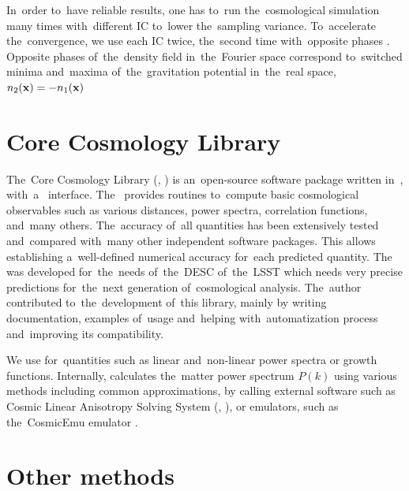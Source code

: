 In~order to~have reliable results, one has to~run the~cosmological simulation many times with~different IC to~lower the~sampling variance. To~accelerate the~convergence, we use each IC twice, the~second time with~opposite phases \parencite{PhysRevD.93.103519}. Opposite phases of~the~density field in~the~Fourier space correspond to~switched minima and~maxima of~the~gravitation potential in~the~real space, $n_2(\mathbf x)=-n_1(\mathbf x)$

\section{Core Cosmology Library}
The~Core Cosmology Library (, \textcite{2019ApJS..242....2C}) is an~open-source software package written in~, with~a~ interface. The~ provides routines to~compute basic cosmological observables such as various distances, power spectra, correlation functions, and~many others. The~accuracy of~all quantities has been extensively tested and~compared with~many other independent software packages. This allows establishing a~well-defined numerical accuracy for~each predicted quantity. The~ was developed for~the~needs of~the~DESC of~the~LSST which needs very precise predictions for~the~next generation of~cosmological analysis. The~author contributed to~the~development of~this library, mainly by writing documentation, examples of~usage and~helping with~automatization process and~improving its compatibility.

We use  for~quantities such as linear and~non-linear power spectra or growth functions. Internally,  calculates the~matter power spectrum  $P(k)$ using various methods including common approximations, by calling external software such as Cosmic Linear Anisotropy Solving System (, \textcite{class}), or emulators, such as the~CosmicEmu emulator \parencite{Heitmann:2015xma}.

\section{Other methods}
